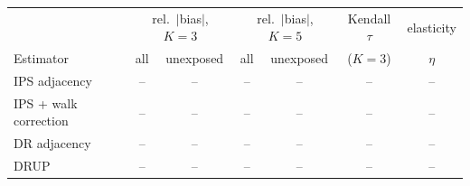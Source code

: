 \begin{tabular}{lcccccc}
\toprule
 & \multicolumn{2}{c}{rel.\ $|$bias$|$, $K=3$} & \multicolumn{2}{c}{rel.\ $|$bias$|$, $K=5$} & Kendall $\tau$ & elasticity\\
Estimator & all & unexposed & all & unexposed & ($K=3$) & $\eta$\\
\midrule
IPS adjacency & -- & -- & -- & -- & -- & --\\
IPS + walk correction & -- & -- & -- & -- & -- & --\\
DR adjacency & -- & -- & -- & -- & -- & --\\
DRUP & -- & -- & -- & -- & -- & --\\
\bottomrule
\end{tabular}
